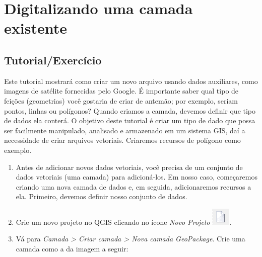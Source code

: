 \documentclass[
]{krantz}
\providecommand{\tightlist}{%
  \setlength{\itemsep}{0pt}\setlength{\parskip}{0pt}}
\begin{document}
\hypertarget{digitalizando-uma-camada-existente}{%
\section{Digitalizando uma camada existente}\label{digitalizando-uma-camada-existente}}

\hypertarget{tutorialexercuxedcio-7}{%
\subsection{Tutorial/Exercício}\label{tutorialexercuxedcio-7}}

Este tutorial mostrará como criar um novo arquivo usando dados auxiliares, como imagens de satélite fornecidas pelo Google. É importante saber qual tipo de feições (geometrias) você gostaria de criar de antemão; por exemplo, seriam pontos, linhas ou polígonos? Quando criamos a camada, devemos definir que tipo de dados ela conterá. O objetivo deste tutorial é criar um tipo de dado que possa ser facilmente manipulado, analisado e armazenado em um sistema GIS, daí a necessidade de criar arquivos vetoriais. Criaremos recursos de polígono como exemplo.

\begin{enumerate}
\def\labelenumi{\arabic{enumi}.}
\tightlist
\item
  Antes de adicionar novos dados vetoriais, você precisa de um conjunto de dados vetoriais (uma camada) para adicioná-los. Em nosso caso, começaremos criando uma nova camada de dados e, em seguida, adicionaremos recursos a ela. Primeiro, devemos definir nosso conjunto de dados.
\item
  Crie um novo projeto no QGIS clicando no ícone \emph{Novo Projeto} \includegraphics{media/modulo7/new-project.png}.
\item
  Vá para \emph{Camada \textgreater{} Criar camada \textgreater{} Nova camada GeoPackage}. Crie uma camada como a da imagem a seguir:
\end{enumerate}
\end{document}
